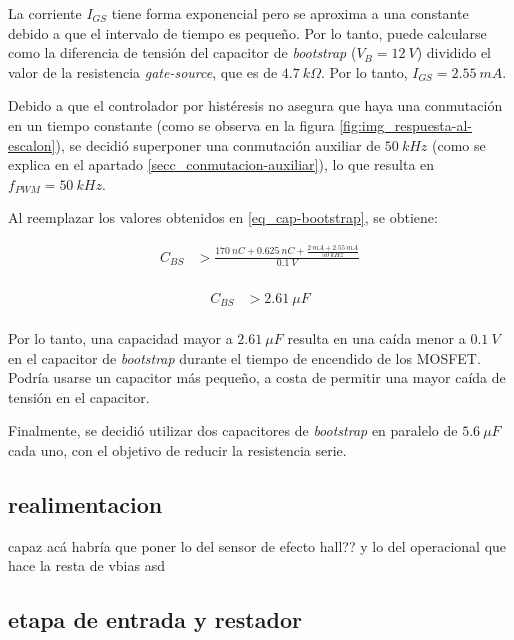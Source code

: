 \noindent La corriente $I_{GS}$ tiene forma exponencial pero se aproxima a una constante debido a que el intervalo de tiempo es pequeño. Por lo tanto, puede calcularse como la diferencia de tensión del capacitor de \textsl{bootstrap} ($V_B=12\:V$) dividido el valor de la resistencia \textsl{gate-source}, que es de $4.7\:k\Omega$. Por lo tanto, $I_{GS}=2.55 \:mA$. 

\noindent Debido a que el controlador por histéresis no asegura que haya una conmutación en un tiempo constante (como se observa en la figura \ref{fig:img_respuesta-al-escalon}), se decidió superponer una conmutación auxiliar de $50\:kHz$ (como se explica en el apartado \ref{secc_conmutacion-auxiliar}), lo que resulta en $f_{PWM}=50 \:kHz$. 

\noindent Al reemplazar los valores obtenidos en \ref{eq_cap-bootstrap}, se obtiene:

\begin{equation} 
	\begin{aligned}
		C_{BS} &> \frac{170 \:nC + 0.625\:nC + \frac{2 \:mA + 2.55 \:mA}{50 \:kHz}}{0.1 \:V}\\
	\end{aligned}
\end{equation}

\begin{equation} 
	\begin{aligned}
		C_{BS} &> 2.61 \:\mu F\\	
	\end{aligned}
\end{equation}


\noindent Por lo tanto, una capacidad mayor a $2.61 \:\mu F$ resulta en una caída menor a $0.1\:V$ en el capacitor de \textsl{bootstrap} durante el tiempo de encendido de los MOSFET. Podría usarse un capacitor más pequeño, a costa de permitir una mayor caída de tensión en el capacitor. 

\noindent Finalmente, se decidió utilizar dos capacitores de \textsl{bootstrap} en paralelo de $5.6 \:\mu F$ cada uno, con el objetivo de reducir la resistencia serie.



\subsection{realimentacion}
capaz acá habría que poner lo del sensor de efecto hall?? y lo del operacional que hace la resta de vbias
asd


\subsection{etapa de entrada y restador}


